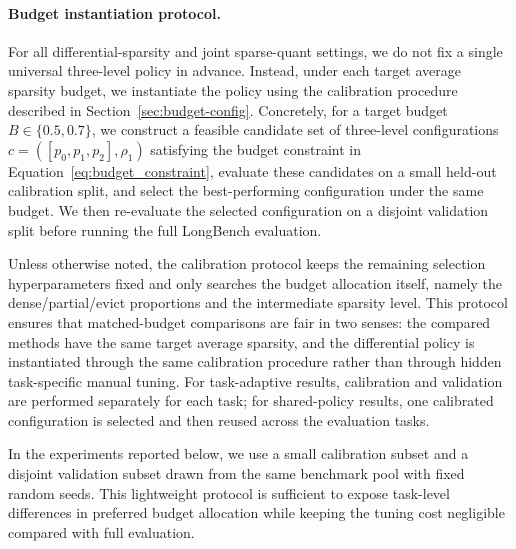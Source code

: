 
\paragraph{Budget instantiation protocol.}
For all differential-sparsity and joint sparse-quant settings, we do not fix a single universal three-level policy in advance.
Instead, under each target average sparsity budget, we instantiate the policy using the calibration procedure described in
Section~\ref{sec:budget-config}. Concretely, for a target budget $B \in \{0.5, 0.7\}$, we construct a feasible candidate set
of three-level configurations $c = ([p_0,p_1,p_2], \rho_1)$ satisfying the budget constraint in
Equation~\eqref{eq:budget_constraint}, evaluate these candidates on a small held-out calibration split, and select the
best-performing configuration under the same budget. We then re-evaluate the selected configuration on a disjoint validation
split before running the full LongBench evaluation.

Unless otherwise noted, the calibration protocol keeps the remaining selection hyperparameters fixed and only searches the
budget allocation itself, namely the dense/partial/evict proportions and the intermediate sparsity level. This protocol
ensures that matched-budget comparisons are fair in two senses: the compared methods have the same target average sparsity,
and the differential policy is instantiated through the same calibration procedure rather than through hidden task-specific
manual tuning. For task-adaptive results, calibration and validation are performed separately for each task; for shared-policy
results, one calibrated configuration is selected and then reused across the evaluation tasks.

In the experiments reported below, we use a small calibration subset and a disjoint validation subset drawn from the same
benchmark pool with fixed random seeds. This lightweight protocol is sufficient to expose task-level differences in preferred
budget allocation while keeping the tuning cost negligible compared with full evaluation.

%
